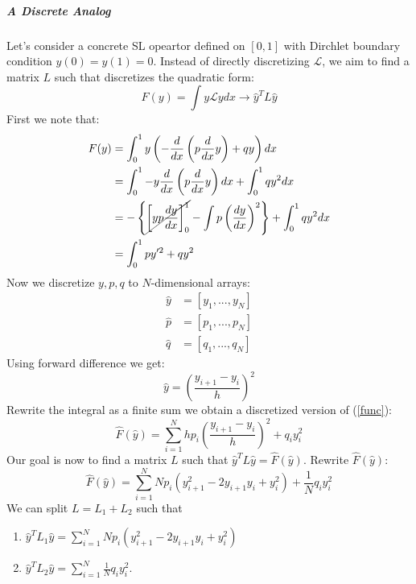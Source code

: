 \subparagraph{A Discrete Analog}

Let's consider a concrete SL opeartor defined on $[0,1]$ with Dirchlet boundary condition $y(0)=y(1)=0$. Instead of directly discretizing $\mathcal L$, we aim to find a matrix $L$ such that discretizes the quadratic form:
\begin{equation}
F(y)=\int y\mathcal Ly dx \rightarrow \hat y^TL\hat y
\end{equation}
First we note that:
\begin{equation}
\label{func}
\begin{aligned}
F(y) &= \int_0^1 y\left(-\frac{d}{dx}\left(p\frac{d}{dx}y\right) + qy\right) dx \\
&= \int_0^1 -y \frac{d}{dx}\left(p\frac{d}{dx}y\right)dx+\int_0^1 qy^2dx  \\
&= -\left\{\cancel{\left[yp\frac{dy}{dx}\right]_0^1} - \int p\left(\frac{dy}{dx}\right)^2 \right\} + \int_0^1 qy^2dx \\
&= \int_0^1 py'^2 + qy^2
\end{aligned}
\end{equation}
Now we discretize $y, p, q$ to $N$-dimensional arrays:
\begin{equation}
\begin{aligned}
\hat y &= [y_1,...,y_N] \\
\hat p &= [p_1,...,p_N] \\
\hat q &= [q_1,...,q_N]
\end{aligned}
\end{equation}
Using forward difference we get:
\begin{equation}
\hat y =\left(\frac{y_{i+1}-y_i}{h}\right)^2
\end{equation}
Rewrite the integral as a finite sum we obtain a discretized version of (\ref{func}):
\begin{equation}
\boxed{\hat F(\hat y)=\sum_{i=1}^N h p_i\left(\frac{y_{i+1}-y_i}{h}\right)^2 +q_iy_i^2}
\end{equation}
Our goal is now to find a matrix $L$ such that $\hat y^TL\hat y=\hat F(\hat y)$. Rewrite $\hat F(\hat y)$:
\begin{equation}
\hat F(\hat y) =\sum_{i=1}^N Np_i(y_{i+1}^2 -2y_{i+1}y_i +y_i^2)+\frac{1}{N}q_iy_i^2
\end{equation}
We can split $L=L_1+L_2$ such that

\begin{enumerate}
\item $\hat y^T L_1 \hat y = \sum_{i=1}^N Np_i(y_{i+1}^2 -2y_{i+1}y_i +y_i^2)$
\item $\hat y^T L_2 \hat y = \sum_{i=1}^N \frac{1}{N}q_iy_i^2$.
\end{enumerate}

